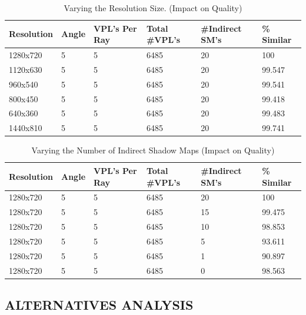 \begin{table}[h!]
	\caption{Varying the Resolution Size. (Impact on Quality)}
	\begin{center}
	    \begin{tabular}{ | l | l | l | l | l | l |}
	    \hline
	    Resolution & Angle & VPL's Per Ray & Total \#VPL's & \#Indirect SM's & \% Similar\\ \hline
	    1280x720 & 5 & 5 & 6485 & 20 & 100\\ \hline
	    1120x630 & 5 & 5 & 6485 & 20 & 99.547\\ \hline
	    960x540 & 5 & 5 & 6485 & 20 & 99.541\\ \hline
	    800x450 & 5 & 5 & 6485 & 20 & 99.418\\ \hline
	    640x360 & 5 & 5 & 6485 & 20 & 99.483\\ \hline
	    1440x810 & 5 & 5 & 6485 & 20 & 99.741\\ \hline
	    \end{tabular}
	\end{center}
	\label{table:5.7}
\end{table}
\begin{table}[h!]
	\caption{Varying the Number of Indirect Shadow Maps (Impact on Quality)}
	\begin{center}
	    \begin{tabular}{ | l | l | l | l | l | l |}
	    \hline
	    Resolution & Angle & VPL's Per Ray & Total \#VPL's & \#Indirect SM's & \% Similar\\ \hline
	    1280x720 & 5 & 5 & 6485 & 20 & 100\\ \hline
	    1280x720 & 5 & 5 & 6485 & 15 & 99.475\\ \hline
	    1280x720 & 5 & 5 & 6485 & 10 & 98.853\\ \hline
	    1280x720 & 5 & 5 & 6485 & 5 & 93.611\\ \hline
	    1280x720 & 5 & 5 & 6485 & 1 & 90.897\\ \hline
	    1280x720 & 5 & 5 & 6485 & 0 & 98.563\\ \hline
	    \end{tabular}
	\end{center}
	\label{table:5.8}
\end{table}
\subsection{ALTERNATIVES ANALYSIS} \label{sec:alternatives}
